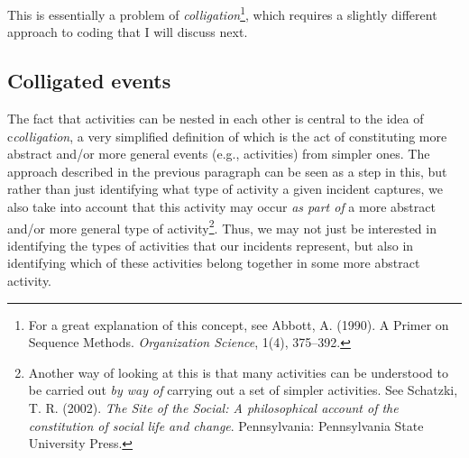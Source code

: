 \documentclass{memoir}
\begin{document}
This is essentially a problem of \emph{colligation}\footnote{For a great explanation of this concept, see Abbott, A. (1990). A Primer on Sequence Methods. \emph{Organization Science}, 1(4), 375–392.}, which requires a slightly different approach to coding that I will discuss next.

\subsection{Colligated events}
\label{sec:colligatedevents}

The fact that activities can be nested in each other is central to the idea of c\emph{colligation}, a very simplified definition of which is the act of constituting more abstract and/or more general events (e.g., activities) from simpler ones. The approach described in the previous paragraph can be seen as a step in this, but rather than just identifying what type of activity a given incident captures, we also take into account that this activity may occur \emph{as part of} a more abstract and/or more general type of activity\footnote{Another way of looking at this is that many activities can be understood to be carried out \emph{by way of} carrying out a set of simpler activities. See Schatzki, T. R. (2002). \emph{The Site of the Social: A philosophical account of the constitution of social life and change}. Pennsylvania: Pennsylvania State University Press.}. Thus, we may not just be interested in identifying the types of activities that our incidents represent, but also in identifying which of these activities belong together in some more abstract activity.   
\end{document}
